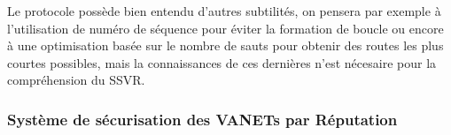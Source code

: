 Le protocole possède bien entendu d'autres subtilités, on pensera par exemple à l'utilisation de numéro de séquence pour éviter la
formation de boucle ou encore à une optimisation basée sur le nombre de sauts pour obtenir des routes les plus courtes possibles,
mais la connaissances de ces dernières n'est nécesaire pour la compréhension du SSVR.


\subsubsection{Système de sécurisation des VANETs par Réputation}
